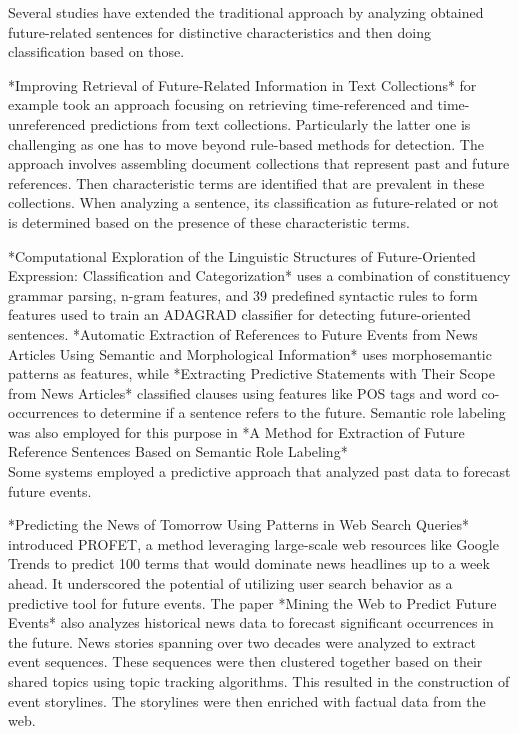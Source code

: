 \documentclass[a4paper,10pt]{report} %
\begin{document}
Several studies have extended the traditional approach by analyzing obtained future-related sentences for distinctive characteristics and then doing classification based on those.

*Improving Retrieval of Future-Related Information in Text Collections* for example took an approach focusing on retrieving time-referenced and time-unreferenced predictions from text collections. Particularly the latter one is challenging as one has to move beyond rule-based methods for detection. The approach involves assembling document collections that represent past and future references. Then characteristic terms are identified that are prevalent in these collections. When analyzing a sentence, its classification as future-related or not is determined based on the presence of these characteristic terms.

*Computational Exploration of the Linguistic Structures of Future-Oriented Expression: Classification and Categorization* uses a combination of constituency grammar parsing, n-gram features, and 39 predefined syntactic rules to form features used to train an ADAGRAD classifier for detecting future-oriented sentences. *Automatic Extraction of References to Future Events from News Articles Using Semantic and Morphological Information* uses morphosemantic patterns as features, while *Extracting Predictive Statements with Their Scope from News Articles* classified clauses using features like POS tags and word co-occurrences to determine if a sentence refers to the future. Semantic role labeling was also employed for this purpose in *A Method for Extraction of Future Reference Sentences Based on Semantic Role  Labeling* \\

Some systems employed a predictive approach that analyzed past data to forecast future events.

*Predicting the News of Tomorrow Using Patterns in Web Search Queries* introduced PROFET, a method leveraging large-scale web resources like Google Trends to predict 100 terms that would dominate news headlines up to a week ahead. It underscored the potential of utilizing user search behavior as a predictive tool for future events.
The paper *Mining the Web to Predict Future Events* also analyzes historical news data to forecast significant occurrences in the future. News stories spanning over two decades were analyzed to extract event sequences. These sequences were then clustered together based on their shared topics using topic tracking algorithms. This resulted in the construction of event storylines. The storylines were then enriched with factual data from the web.
\end{document}
